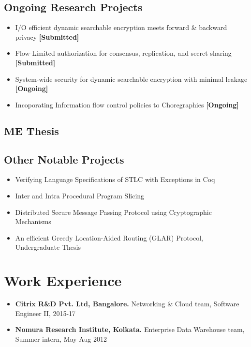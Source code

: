 \documentclass[9pt,a4paper]{moderncv}
\begin{document}
\subsection{Ongoing Research Projects}
\begin{itemize}
\item I/O efficient dynamic searchable encryption meets forward \& backward privacy \textbf{\textsf{[Submitted]}}
\item Flow-Limited authorization for consensus, replication, and secret sharing \textbf{\textsf{[Submitted]}}
\item System-wide security for dynamic searchable encryption with minimal leakage \textsf{\textbf{[Ongoing]}}
\item Incoporating Information flow control policies to Choregraphies \textsf{\textbf{[Ongoing]}}
\end{itemize}
\subsection{ME Thesis}
\subsection{Other Notable Projects}
\begin{itemize}
\item Verifying Language Specifications of STLC with Exceptions in Coq %
\item Inter and Intra Procedural Program Slicing%
\item Distributed Secure Message Passing Protocol using Cryptographic Mechanisms%
\item An efficient Greedy Location-Aided Routing (GLAR) Protocol, Undergraduate Thesis
\end{itemize}
\section{Work Experience}
\begin{itemize}
\item \textbf{Citrix R\&D Pvt. Ltd, Bangalore.} Networking \& Cloud team, Software Engineer II, 2015-17
\item \textbf{Nomura Research Institute, Kolkata.} Enterprise Data Warehouse team, Summer intern, May-Aug 2012
\end{itemize}
\end{document}
